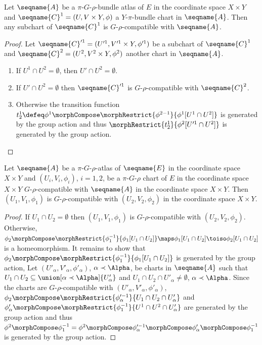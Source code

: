 \documentclass{article}
\begin{document}
\begin{lemma}
\label{lem:BunCompat}
Let $\seqname{A}$ be a $\pi$-$G$-$\rho$-bundle atlas of $E$ in the
coordinate space $X \times Y$ and
$\seqname{C}^1 = (U, V \times Y, \phi)$ a $Y$-$\pi$-bundle chart in
$\seqname{A}$. Then any subchart of $\seqname{C}^1$ is
$G$-$\rho$-compatible with $\seqname{A}$.

\begin{proof}
Let $\seqname{C}'^1 = (U'^1, V'^1 \times Y, \phi'^1)$ be a subchart of
$\seqname{C}^1$ and $\seqname{C}^2 = (U^2, V^2 \times Y, \phi^2)$
another chart in $\seqname{A}$.

\begin{enumerate}
\item If $U^1 \cap U^2 = \emptyset$, then $U' \cap U^2 = \emptyset$.
\item If $U' \cap U^2 = \emptyset$ then $\seqname{C}'^1$ is
$G$-$\rho$-compatible with $\seqname{C}^2$.
\item Otherwise the transition function
$
  t^1_2 \defeq
  \phi^1 \morphCompose \morphRestrict{\phi^{2-1}}{\phi^1[U^1 \cap U^2]}
$
is generated by the group action and thus
$\morphRestrict{t^1_2}{\phi^2[U'^1 \cap U^2]}$ is generated by the group
action.
\end{enumerate}
\end{proof}
\end{lemma}

\begin{lemma}
\label{def:piGrho-atl:extensions}
Let $\seqname{A}$ be a $\pi$-$G$-$\rho$-atlas of $\seqname{E}$ in the
coordinate space $X \times Y$ and $(U_i,V_i,\phi_i)$, $i=1,2$, be a
$\pi$-$G$-$\rho$ chart of $E$ in the coordinate space $X \times Y$
$G$-$\rho$-compatible with $\seqname{A}$ in the coordinate space $X
\times Y$.  Then $(U_1,V_1,\phi_1)$ is $G$-$\rho$-compatible with
$(U_2,V_2,\phi_2)$ in the coordinate space $X \times Y$.

\begin{proof}
If $U_1 \cap U_2 = \emptyset$ then $(U_1,V_1,\phi_1)$ is
$G$-$\rho$-compatible with $(U_2,V_2,\phi_2)$. Otherwise,
$
  \phi_2 \morphCompose \morphRestrict{\phi^{-1}_1}{\phi_1[U_1 \cap U_2]}
  \maps
  \phi_1[U_1 \cap U_2] \toiso
  \phi_2[U_1 \cap U_2]
$
is a homeomorphism.  It remains to show that
$\phi_2 \morphCompose \morphRestrict{\phi^{-1}_1}{\phi_1[U_1 \cap U_2]}$ is
generated by the group action, Let $(U'_\alpha,V'_\alpha,\phi'_\alpha)$,
$\alpha \prec \Alpha$, be charts in $\seqname{A}$ such that
$U_1 \cap U_2 \subseteq \union[\alpha \prec \Alpha]{U'_\alpha}$ and
$U_1 \cap U_2 \cap U'_\alpha \neq \emptyset$, $\alpha \prec \Alpha$.
Since the charts are $G$-$\rho$-compatible with
$(U'_\alpha,V'_\alpha,\phi'_\alpha)$,
$
\phi_2 \morphCompose \morphRestrict{\phi'^{-1}_\alpha}{U_1 \cap U_2 \cap
U'_\alpha}
$
and
$\phi'_\alpha \morphCompose \morphRestrict{\phi^{-1}_1}{U^1 \cap U^2 \cap
U'_\alpha}
$
are generated by the group action and thus
$\phi^2 \morphCompose \phi^{-1}_1 = \phi^2 \morphCompose \phi'^{-1}_\alpha \morphCompose
\phi'_\alpha \morphCompose \phi^{-1}_1$
is generated by the group action.
\end{proof}
\end{lemma}
\end{document}
